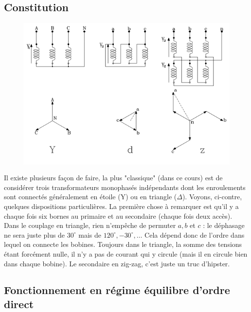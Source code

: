 	\subsection{Constitution}
		\begin{figure}
		\vspace{-8mm}
		\includegraphics[scale=0.45]{ch3/imager5.png}
		\end{figure}				
	Il existe plusieurs façon de faire, la plus "classique" (dans ce cours) est de 
	considérer trois transformateurs monophasés indépendants dont les enroulements 
	sont connectés généralement en étoile (Y) ou en triangle ($\Delta$). Voyons, 
	ci-contre,	quelques dispositions particulières.
	La première chose à remarquer est qu'il y a chaque fois six bornes au primaire 
	et au secondaire (chaque fois deux accès). Dans le couplage en triangle, rien 
	n'empêche de permuter $a,b$ et $c$ : le déphasage ne sera juste plus de $30^\circ$ 
	mais de $120^\circ, -30^\circ,\dots$ Cela dépend donc de l'ordre dans lequel on 
	connecte les bobines. Toujours dans le triangle, la somme des tensions étant 
	forcément nulle, il n'y a pas de courant qui y circule (mais il en circule bien 
	dans chaque bobine). Le secondaire en zig-zag, c'est juste un truc d'hipster.
	
	\subsection{Fonctionnement en régime équilibre d'ordre direct}
